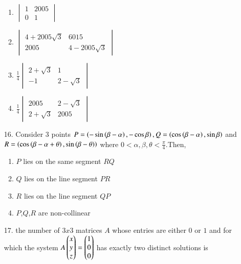 \documentclass[journal,12pt,twocolumn]{IEEEtran}
\theoremstyle{remark}
\begin{document}
\begin{enumerate}
			\begin{enumerate}[label=(\alph*)]
				\item $\begin{vmatrix} 1 & 2005\\0 & 1 \end{vmatrix}$
				 \item $\begin{vmatrix} 4 + 2005\sqrt{3} & 6015 \\ 2005 & 4 - 2005\sqrt{3}\end{vmatrix}$
					 \item $\frac{1}{4}\begin{vmatrix}2 + \sqrt{3} & 1 \\ -1 & 2 -\sqrt{3}\end{vmatrix}$
						 \item $\frac{1}{4}\begin{vmatrix}2005 & 2 - \sqrt{3} \\ 2 + \sqrt{3} & 2005\end{vmatrix}$
			\end{enumerate}		
		\item[16.] Consider 3 points $P=\left(-\sin \left(\beta - \alpha\right), - \cos\beta\right), Q = \left(\cos \left(\beta - \alpha\right), \sin\beta\right)$ and $R = \left(\cos \left(\beta - \alpha + \theta\right), \sin\left(\beta - \theta\right)\right)$ where $0<\alpha,\beta,\theta<\frac{\pi}{4}.$Then, \hfill{}
			\begin{enumerate}[label = (\alph*)]
				\item $P$ lies on the same segment $RQ$
				\item $Q$ lies on the line segment $PR$
				\item $R$ lies on the line segment $QP$
				\item $P$,$Q$,$R$ are non-collinear
			\end{enumerate}
	\item[17.] the number of $3x3$ matrices $A$ whose entries are either $0$ or $1$ and for which the system $A\begin{pmatrix}x\\y\\z\end{pmatrix}=\begin{pmatrix}1\\0\\0\end{pmatrix}$ has exactly two distinct solutions is \hfill{}


\end{enumerate}
\end{document}
